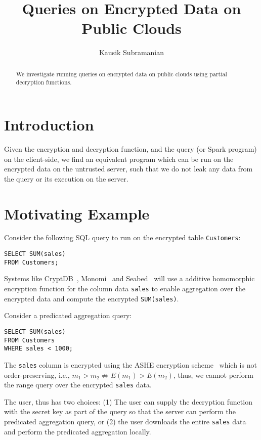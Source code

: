 \documentclass[]{article}
\title{Queries on Encrypted Data on Public Clouds}
\author{Kausik Subramanian}
\begin{document}
\maketitle

\begin{abstract}
We investigate running queries on encrypted data on public clouds using partial decryption functions. 
\end{abstract}

\section{Introduction}
Given the encryption and decryption function, and the query (or Spark program) 
on the client-side, we find an equivalent program which can be run on the encrypted
data on the untrusted server, such that we do not leak any data from the 
query or its execution on the server. 

\section{Motivating Example}
Consider the following SQL query to run on the encrypted table \texttt{Customers}:
\begin{verbatim}
SELECT SUM(sales)
FROM Customers; 
\end{verbatim}
Systems like CryptDB~\cite{cryptdb}, Monomi~\cite{monomi} 
and Seabed~\cite{seabed} will use a additive homomorphic
encryption function for the column data \texttt{sales} to
enable aggregation over the encrypted data and compute the
encrypted \texttt{SUM(sales)}. 

\noindent Consider a predicated aggregation query:
\begin{verbatim}
SELECT SUM(sales)
FROM Customers
WHERE sales < 1000; 
\end{verbatim}
The \texttt{sales} column is encrypted using the ASHE encryption 
scheme~\cite{seabed} which is not order-preserving, i.e.,
$m_1 > m_2 \not\Rightarrow E(m_1) > E(m_2)$, thus, we cannot
perform the range query over the encrypted \texttt{sales} data. 

The user, thus has two choices: (1) The user can supply the 
decryption function with the secret key as part of the query
so that the server can perform the predicated aggregation query,
or (2) the user downloads the entire \texttt{sales} data and 
perform the predicated aggregation locally. 
\end{document}
